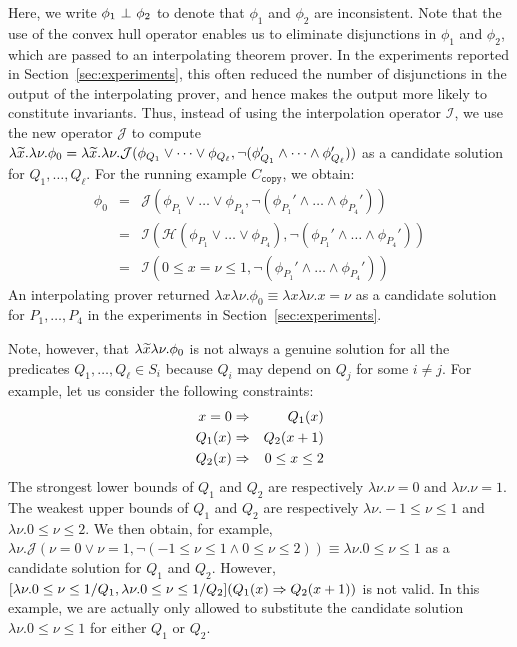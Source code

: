 Here, we write \(\phi_1 \ \bot\  \phi_2\) to denote that \(\phi_1\) and 
\(\phi_2\) are inconsistent.  Note that the use of the convex hull 
operator enables us to eliminate disjunctions in \(\phi_1\) and 
\(\phi_2\), which are passed to an interpolating theorem prover.
In the experiments reported in Section~\ref{sec:experiments}, this often 
reduced the number of disjunctions in the output of the interpolating 
prover, and hence makes the output more likely to constitute invariants.
%
Thus, instead of using the interpolation operator \(\mathcal{I}\), we 
use the new operator \(\mathcal{J}\) to compute \(\lambda\widetilde{x}.\lambda 
\nu.\phi_0=\lambda\widetilde{x}.\lambda \nu.\mathcal{J}(\phi_{Q_1} \lor \dots 
\lor \phi_{Q_{\ell}},\neg (\phi_{Q_1}' \land \dots \land 
\phi_{Q_{\ell}}'))\) as a candidate solution for \(Q_1,\dots,Q_{\ell}\). 
 For the running example \(C_{\texttt{copy}}\), we obtain:
\begin{eqnarray*}
\phi_0 &=& \mathcal{J}(\phi_{P_1} \lor \dots \lor \phi_{P_4},\neg (\phi_{P_1}' \land \dots \land \phi_{P_4}')) \\
&=& \mathcal{I}(\mathcal{H}(\phi_{P_1} \lor \dots \lor \phi_{P_4}),\neg (\phi_{P_1}' \land \dots \land \phi_{P_4}')) \\
&=& \mathcal{I}(0 \leq x=\nu \leq 1,\neg (\phi_{P_1}' \land \dots \land \phi_{P_4}'))
\end{eqnarray*}
An interpolating prover returned \(\lambda x \lambda \nu.\phi_0 \equiv 
\lambda x \lambda \nu.x=\nu\) as a candidate solution for 
\(P_1,\dots,P_4\) in the experiments in Section~\ref{sec:experiments}.

Note, however, that \(\lambda \widetilde{x} \lambda \nu.\phi_0\) is not always 
a genuine solution for all the predicates \(Q_1,\dots,Q_{\ell} \in S_i\) 
because \(Q_i\) may depend on \(Q_j\) for some \(i \neq j\).  For 
example, let us consider the following constraints:
\begin{eqnarray*}
x=0 &\Rightarrow& Q_1(x) \\
Q_1(x) &\Rightarrow& Q_2(x+1) \\
Q_2(x) &\Rightarrow& 0 \leq x \leq 2
\end{eqnarray*}
The strongest lower bounds of \(Q_1\) and \(Q_2\) are respectively 
\(\lambda \nu.\nu=0\) and \(\lambda \nu.\nu=1\).  The weakest upper 
bounds of \(Q_1\) and \(Q_2\) are respectively \(\lambda \nu.-1 \leq \nu 
\leq 1\) and \(\lambda \nu.0 \leq \nu \leq 2\).  We then obtain, for 
example, \(\lambda \nu.\mathcal{J}(\nu=0 \lor \nu=1,\neg (-1 \leq \nu 
\leq 1 \land 0 \leq \nu \leq 2)) \equiv \lambda \nu.0 \leq \nu \leq 1\) 
as a candidate solution for \(Q_1\) and \(Q_2\).  However, \([\lambda 
\nu.0 \leq \nu \leq 1/Q_1,\lambda \nu.0 \leq \nu \leq 1/Q_2](Q_1(x) 
\Rightarrow Q_2(x+1))\) is not valid.  In this example, we are actually only 
allowed to substitute the candidate solution \(\lambda \nu.0 \leq \nu 
\leq 1\) for either \(Q_1\) or \(Q_2\).

